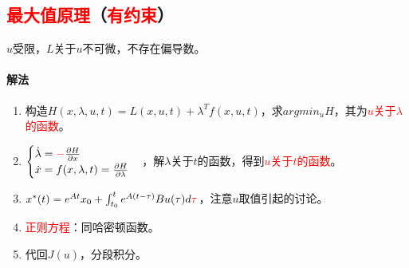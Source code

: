 \documentclass[
12pt, %
a4paper, 
oneside, %
]{scrartcl}
\begin{document}
\subsection[最大值原理]{\textcolor{red}{最大值原理}（\textcolor{red}{有约束}）}
$ u $受限，$ L $关于$ u $不可微，不存在偏导数。
\paragraph{解法}
\begin{enumerate}
\item 构造$ H(x, \lambda, u, t) = L(x, u, t) + \lambda^T f(x, u, t) $，求$ argmin_{u} H $，其为\textcolor{red}{$ u $关于$ \lambda $的函数}。
\item $ \begin{cases} \dot{\lambda} = \textcolor{red}{-}\frac{\partial H}{\partial x} \\ \dot{x} = f(x, \lambda, t) = \frac{\partial H}{\partial \lambda} \end{cases} $，解$ \lambda $关于$ t $的函数，得到\textcolor{red}{$ u $关于$ t $的函数}。
\item $ x^*(t) = e^{At} x_0 + \int_{t_0}^{t} e^{A(t - \tau)} B u(\tau) d \textcolor{red}{\tau} $，注意$ u $取值引起的讨论。
\item \textcolor{red}{正则方程}：同哈密顿函数。
\item 代回$ J(u) $，分段积分。
\end{enumerate}
\end{document}
